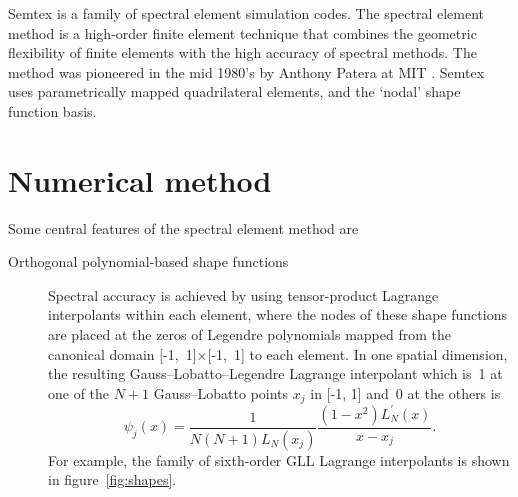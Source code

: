 \documentclass[11pt,a4paper]{report}
\begin{document}
\textsf{Semtex} is a family of spectral element simulation codes.  The
spectral element method is a high-order finite element technique that
combines the geometric flexibility of finite elements with the high
accuracy of spectral methods.  The method was pioneered in the mid
1980's by Anthony Patera at MIT \cite{pat84,kp86}. \textsf{Semtex}
uses parametrically mapped quadrilateral elements, and the `nodal'
shape function basis.

\section{Numerical method}

Some central features of the spectral element method are
\begin{description}
\item[Orthogonal polynomial-based shape functions] Spectral accuracy
is achieved by using tensor-product Lagrange interpolants within each
element, where the nodes of these shape functions are placed at the
zeros of Legendre polynomials mapped from the canonical domain
[-1,~1]$\times$[-1,~1] to each element.  In one spatial dimension, the
resulting Gauss--Lobatto--Legendre Lagrange interpolant which is~1 at
one of the $N + 1$ Gauss--Lobatto points $x_j$ in [-1, 1] and~0 at the
others is
\begin{equation}
\psi_j(x) = \frac{1}{N(N+1)L_N(x_j)}\frac{(1-x^2)L_N^\prime(x)}{x - x_j}.
\end{equation}
For example, the family of sixth-order GLL Lagrange interpolants is
shown in figure~\ref{fig:shapes}.
\begin{figure}


\end{figure}
\end{description}
\end{document}
